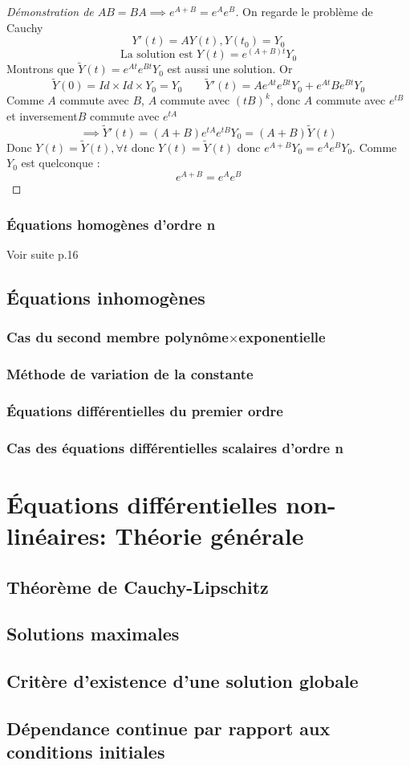 \documentclass[]{report}
\begin{document}
\begin{proof}[Démonstration de $AB=BA\implies e^{A+B}=e^A e^B$]
    On regarde le problème de Cauchy 
    \[Y'(t)=AY(t),Y(t_0)=Y_0\]
    \[\text{La solution est }Y(t)=e^{(A+B)t}Y_0\]
    Montrons que $\widetilde{Y}(t)=e^{At}e^{Bt}Y_0$ est aussi une solution. Or
    \[\widetilde{Y}(0)=Id\times Id\times Y_0=Y_0\qquad \widetilde{Y}'(t)=Ae^{At}e^{Bt}Y_0+e^{At}Be^{Bt}Y_0\]
    Comme $A$ commute avec $B$, $A$ commute avec $(tB)^k$, donc $A$ commute avec $e^{tB}$ et inversement$B$ commute avec $e^{tA}$
    \[\implies \widetilde{Y}'(t)=(A+B)e^{tA}e^{tB}Y_0=(A+B)\widetilde{Y}(t)\]
    Donc $Y(t)=\widetilde{Y}(t),\forall t$ donc $Y(t)=\widetilde{Y}(t)$ donc $e^{A+B}Y_0=e^A e^B Y_0$. Comme $Y_0$ est quelconque :
    \[e^{A+B}=e^A e^B\] 
\end{proof}

\subsection{Équations homogènes d'ordre n}

Voir suite p.16

\section{Équations inhomogènes}

\subsection{Cas du second membre polynôme$\times$exponentielle}

\subsection{Méthode de variation de la constante}

\subsection*{Équations différentielles du premier ordre}

\subsection*{Cas des équations différentielles scalaires d'ordre n}

\chapter{Équations différentielles non-linéaires: Théorie générale}

\section{Théorème de Cauchy-Lipschitz}

\section{Solutions maximales}

\section{Critère d'existence d'une solution globale}

\section{Dépendance continue par rapport aux conditions initiales}
\end{document}
